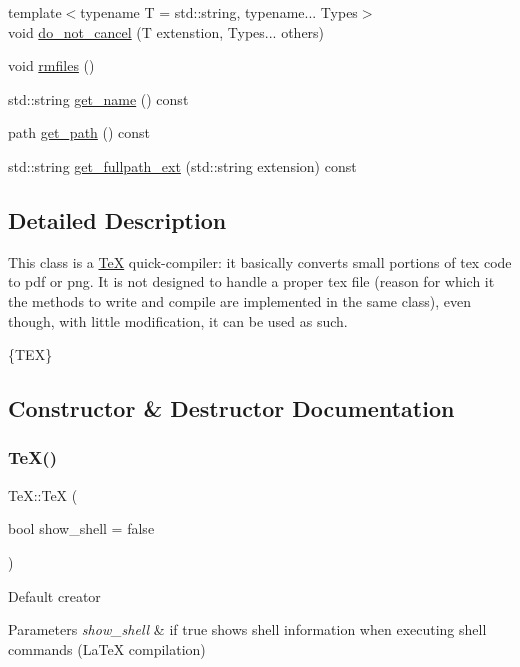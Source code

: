 \begin{DoxyCompactItemize}
{\footnotesize template$<$typename T  = std\+::string, typename... Types$>$ }\\void \hyperlink{class_te_x_acf8a041cbb39d209b72c66ebec52be99}{do\+\_\+not\+\_\+cancel} (T extenstion, Types... others)
\item 
void \hyperlink{class_te_x_a788c3b484fdcc4797915044b9c6e67aa}{rmfiles} ()
\item 
std\+::string \hyperlink{class_te_x_aacfd237cb2f7ea19afe01895fc1987dc}{get\+\_\+name} () const
\item 
path \hyperlink{class_te_x_a8252aa7134ebc330a8b3da6462f13aeb}{get\+\_\+path} () const
\item 
std\+::string \hyperlink{class_te_x_a18399db9f0d97b7c06e7fa72d1a146c4}{get\+\_\+fullpath\+\_\+ext} (std\+::string extension) const
\end{DoxyCompactItemize}


\subsection{Detailed Description}
This class is a \hyperlink{class_te_x}{TeX} quick-\/compiler\+: it basically converts small portions of tex code to pdf or png. It is not designed to handle a proper tex file (reason for which it the methods to write and compile are implemented in the same class), even though, with little modification, it can be used as such.

\{T\+EX\} 

\subsection{Constructor \& Destructor Documentation}
\mbox{\label{class_te_x_aab21a09cfa857de0126d81b9f5743417}} 
\subsubsection{\texorpdfstring{Te\+X()}{TeX()}\hspace{0.1cm}{\footnotesize\ttfamily [1/2]}}
{\footnotesize\ttfamily Te\+X\+::\+TeX (\begin{DoxyParamCaption}\item[{bool}]{show\+\_\+shell = {\ttfamily false} }\end{DoxyParamCaption})}

Default creator 
\begin{DoxyParams}{Parameters}
{\em show\+\_\+shell} & if true shows shell information when executing shell commands (La\+TeX compilation) \\
\hline
\end{DoxyParams}
\mbox{\label{class_te_x_a2f70e397b6e5136c7ba421fe82bd5f4d}} 
